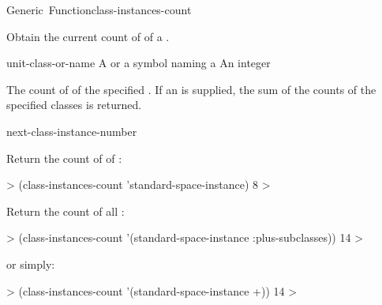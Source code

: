 \documentclass[10pt,twoside,english,pdftex]{article}
\begin{document}
\begin{functiondoc}{Generic~Function}{class-instances-count}%
  { 
    \returns{} }
%
%

\fnsyntax

\fnpurpose Obtain the current count of  of a
. 

\fnmethods
{}%
  {\code{(} 
  \returns{} } 
%
  {\code{(} 
  \returns{} } 
%
  {\code{(} 
  \returns{} }

\fnpackage {}

\fnmodule {}

\fnargs
\begin{args}{unit-class-or-name}
 A  or a symbol naming a
\arg[count] An integer
\end{args}

\fnreturns The count of  of the
specified .  If an
 is supplied, the sum of the
 counts of the specified classes is returned.

\begin{alsos}{next-class-instance-number}
\end{alsos}

\fnexamples
Return the count of  of
: 
%
\W\supp
\begin{example}
  > (class-instances-count 'standard-space-instance)
  8
  >
\end{example} 
%
Return the count of all :
%
\W\supp\notpretop
\begin{example}
  > (class-instances-count '(standard-space-instance :plus-subclasses))
  14
  >
\end{example} 
%
or simply:
%
\W\supp\notpretop
\begin{example}
  > (class-instances-count '(standard-space-instance +))
  14
  >
\end{example} 

\end{functiondoc}
\end{document}
